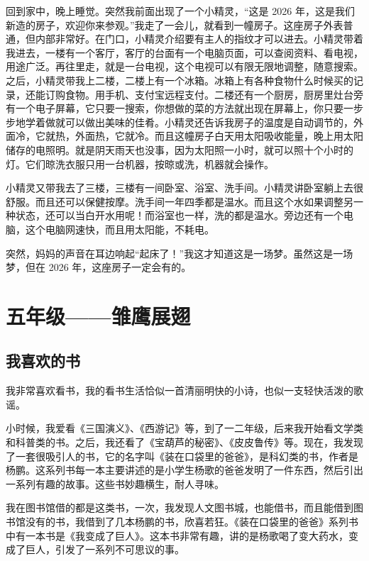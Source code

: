 \documentclass[UTF8,a4paper,titlepage,twoside,10.5pt]{article}
\begin{document}
回到家中，晚上睡觉。突然我前面出现了一个小精灵，“这是 2026 年，这是我们新造的房子，欢迎你来参观。”我走了一会儿，就看到一幢房子。这座房子外表普通，但内部非常好。在门口，小精灵介绍要有主人的指纹才可以进去。小精灵带着我进去，一楼有一个客厅，客厅的台面有一个电脑页面，可以查阅资料、看电视，用途广泛。再往里走，就是一台电视，这个电视可以有限无限地调整，随意搜索。之后，小精灵带我上二楼，二楼上有一个冰箱。冰箱上有各种食物什么时候买的记录，还能订购食物。用手机、支付宝远程支付。二楼还有一个厨房，厨房里灶台旁有一个电子屏幕，它只要一搜索，你想做的菜的方法就出现在屏幕上，你只要一步步地学着做就可以做出美味的佳肴。小精灵还告诉我房子的温度是自动调节的，外面冷，它就热，外面热，它就冷。而且这幢房子白天用太阳吸收能量，晚上用太阳储存的电照明。就是阴天雨天也没事，因为太阳照一小时，就可以照十个小时的灯。它们晾洗衣服只用一台机器，按晾或洗，机器就会操作。

小精灵又带我去了三楼，三楼有一间卧室、浴室、洗手间。小精灵讲卧室躺上去很舒服。而且还可以保健按摩。洗手间一年四季都是温水。而且这个水如果调整另一种状态，还可以当白开水用呢！而浴室也一样，洗的都是温水。旁边还有一个电脑，这个电脑网速快，而且用太阳能，不耗电。

突然，妈妈的声音在耳边响起“起床了！”我这才知道这是一场梦。虽然这是一场梦，但在 2026 年，这座房子一定会有的。

\newpage

\section{五年级——雏鹰展翅}
\label{sec:org7171a92}

\subsection{我喜欢的书}
\label{sec:orgf71519a}

我非常喜欢看书，我的看书生活恰似一首清丽明快的小诗，也似一支轻快活泼的歌谣。

小时候，我爱看《三国演义》、《西游记》等，到了一二年级，后来我开始看文学类和科普类的书。之后，我还看了《宝葫芦的秘密》、《皮皮鲁传》等。现在，我发现了一套很吸引人的书，它的名字叫《装在口袋里的爸爸》，是科幻类的书，作者是杨鹏。这系列书每一本主要讲述的是小学生杨歌的爸爸发明了一件东西，然后引出一系列有趣的故事。这些书妙趣横生，耐人寻味。

我在图书馆借的都是这类书，一次，我发现人文图书城，也能借书，而且能借到图书馆没有的书，我借到了几本杨鹏的书，欣喜若狂。《装在口袋里的爸爸》系列书中有一本书是《我变成了巨人》。这本书非常有趣，讲的是杨歌喝了变大药水，变成了巨人，引发了一系列不可思议的事。
\end{document}
